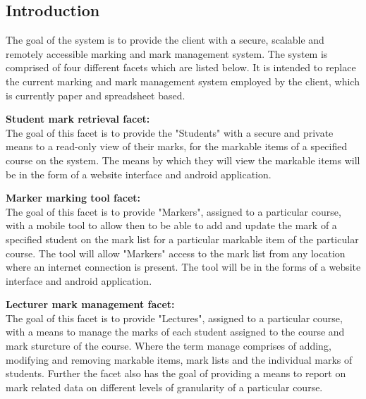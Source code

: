 \documentclass[12pt]{article}
\begin{document}
		\subsection{Introduction}
			\begin{flushleft}
				\vspace{0.2in}
	
				The goal of the system is to provide the client with a secure, scalable and remotely accessible marking and mark management system. The system is comprised of four different facets which are listed below. It is intended to replace the current marking and mark management system employed by the client, which is currently paper and spreadsheet based.
				
				\vspace{0.5cm}
				\textbf{Student mark retrieval facet:}
				\vspace{0.1in}
				\\
				The goal of this facet is to provide the "Students" with a secure and private means to a read-only view of their marks, for the markable items of a specified course on the system. The means by which they will view the markable items will be in the form of a website interface and android application.
				
				\vspace{0.5cm}
				\textbf{Marker marking tool facet:}
				\vspace{0.1in}
				\\
				The goal of this facet is to provide "Markers", assigned to a particular course, with a mobile tool to allow then to be able to add and update the mark of a specified student on the mark list for a particular markable item of the particular course. The tool will allow "Markers" access to the mark list from any location where an internet connection is present. The tool will be in the forms of a website interface and android application.
				
				\vspace{0.5cm}
				\textbf{Lecturer mark management facet:}
				\vspace{0.1in}
				\\
				The goal of this facet is to provide "Lectures", assigned to a particular course, with a means to manage the marks of each student assigned to the course and mark sturcture of the course. Where the term manage comprises of adding, modifying and removing markable items, mark lists and the individual marks of students. Further the facet also has the goal of providing a means to report on mark related data on different levels of granularity of a particular course.
				

\end{flushleft}
\end{document}
